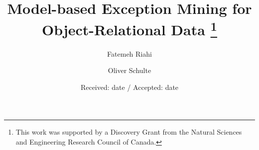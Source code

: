 {%
\newcommand{\pot}{\phi} %
\newcommand{\test}{test}
\def\set#1{\mathbf{#1}}
\def\bs#1{\boldsymbol{#1}}
\def\ground#1{\overline{#1}}
\usepackage{filecontents} 


\title{Model-based Exception Mining for Object-Relational Data
\thanks{This work was supported by a Discovery Grant from the Natural Sciences and Engineering Research Council of Canada.}
}


\author{Fatemeh Riahi        \and
        Oliver Schulte %
}



\date{Received: date / Accepted: date}

\maketitle

}
